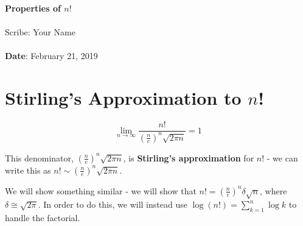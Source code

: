 \documentclass[11pt,twosided]{article}
\def\titlestring{Properties of $n!$}
\def\scribestring{Your Name}
\def\datestring{February 21, 2019}
\begin{document}
\thispagestyle{plain}  %

\noindent
{\LARGE \textbf{\titlestring}}\\\\
%
{\Large Scribe: \scribestring}\\ \\
{\textbf{Date}: \datestring}


\noindent

\section{Stirling's Approximation to $n$!}
\begin{theorem}
\[
\lim_{n\to \infty} \frac{n!}{\left(\frac{n}{e} \right)^n \sqrt{2\pi n}} = 1
\]
\end{theorem}
This denominator, $\left(\frac{n}{e} \right)^n \sqrt{2\pi n}$, is \textbf{Stirling's approximation} for $n$! - we can write this as $n! \sim \left(\frac{n}{e} \right)^n \sqrt{2\pi n}$.  

We will show something similar - we will show that $n! = \left( \frac{n}{e} \right)^n \delta \sqrt{n}$, where $\delta \cong \sqrt{2\pi}$. In order to do this, we will instead use $\log(n!) = \sum_{k=1}^n \log k$ to handle the factorial. 
\end{document}
